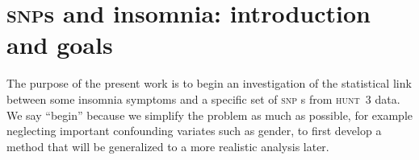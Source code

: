 \documentclass[\ifafour a4paper,12pt,\else a5paper,10pt,\fi%
onecolumn,oneside,article,%
british%
]{memoir}
\title{\propertitle}
\author{%
\hspace*{\stretch{1}}%
\parbox{0.5\linewidth}%
{\protect\centering D. Bragantini\\%
\footnotesize\epost{\email{daniela.bragantini}{ntnu.no}}}%
\hspace*{\stretch{1}}%
\parbox{0.5\linewidth}%
{\protect\centering P.G.L. Porta Mana\\%
\footnotesize\epost{\email{piero.mana}{ntnu.no}}}%
\hspace*{\stretch{1}}%
\\[0.25\jot]\hspace*{\stretch{1}}%
\parbox{0.5\linewidth}%
{\protect\centering C. G\"uzey\\%
\footnotesize\epost{\email{cuneyt.guzey}{ntnu.no}}}%
\hspace*{\stretch{1}}%
\parbox{0.5\linewidth}%
{\protect\centering Y. Roudi\\%
\footnotesize\epost{\email{yasser.roudi}{ntnu.no}}}%
\hspace*{\stretch{1}}%
\\[0.25\jot]\hspace*{\stretch{1}}%
\parbox{0.5\linewidth}%
{\protect\centering\footnotesize\itshape Dept of Mental Health, NTNU, Trondheim}%
\hspace*{\stretch{1}}%
\parbox{0.5\linewidth}%
{\protect\centering\footnotesize\itshape Kavli Institute, Trondheim}%
\hspace*{\stretch{1}}%
}
\date{\firstpublished; updated \updated}
\theoremstyle{remark}
\theoremstyle{innote}
\newcommand*{\amp}{\&}
\newcommand*{\asudedication}[1]{%
{\par\centering\textit{#1}\par}}
\renewcommand*{\|}[1][]{\nonscript\,#1\vert\nonscript\;\mathopen{}}
\newcommand*{\snp}{\textsc{snp}}
\newcommand*{\hunt}{\textsc{hunt}}
\begin{document}
\captiondelim{\quad}\captionnamefont{\footnotesize}\captiontitlefont{\footnotesize}
\frenchspacing
\maketitle

\abstractrunin
\abslabeldelim{}
\renewcommand*{\abstractname}{}
\setlength{\absleftindent}{0pt}
\setlength{\absrightindent}{0pt}
\setlength{\abstitleskip}{-\absparindent}
\begin{abstract}%
  \noindent ***
\\\noindent\emph{\footnotesize Note: Dear Reader
    \amp\ Peer, this manuscript is being peer-reviewed by you. Thank you.}
\end{abstract}
\frenchspacing





\section{\snp s and insomnia: introduction and goals}
\label{sec:intro}

The purpose of the present work is to begin an investigation of the
statistical link between some insomnia symptoms and a specific set of \snp
s from \hunt\ 3 data. We say \enquote{begin} because we simplify the
problem as much as possible, for example neglecting important confounding
variates such as gender, to first develop a method that will be generalized
to a more realistic analysis later.
\end{document}
